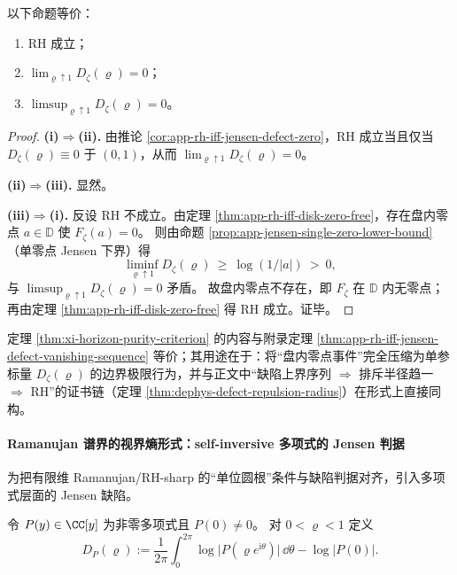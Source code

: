 \begin{theorem}\label{thm:xi-horizon-purity-criterion}
以下命题等价：
\begin{enumerate}
  \item[(i)] RH 成立；
  \item[(ii)] \(\displaystyle \lim_{\varrho\uparrow 1}D_{\zeta}(\varrho)=0\)；
  \item[(iii)] \(\displaystyle \limsup_{\varrho\uparrow 1}D_{\zeta}(\varrho)=0\)。
\end{enumerate}
\end{theorem}

\begin{proof}
\textbf{(i)\(\Rightarrow\)(ii).}
由推论 \ref{cor:app-rh-iff-jensen-defect-zero}，RH 成立当且仅当 \(D_{\zeta}(\varrho)\equiv 0\) 于 \((0,1)\)，从而 \(\lim_{\varrho\uparrow 1}D_{\zeta}(\varrho)=0\)。
\par
\textbf{(ii)\(\Rightarrow\)(iii).}
显然。
\par
\textbf{(iii)\(\Rightarrow\)(i).}
反设 RH 不成立。由定理 \ref{thm:app-rh-iff-disk-zero-free}，存在盘内零点 \(a\in\mathbb{D}\) 使 \(F_{\zeta}(a)=0\)。
则由命题 \ref{prop:app-jensen-single-zero-lower-bound}（单零点 Jensen 下界）得
\[
\liminf_{\varrho\uparrow 1}D_{\zeta}(\varrho)\ \ge\ \log(1/|a|)\ >\ 0,
\]
与 \(\limsup_{\varrho\uparrow 1}D_{\zeta}(\varrho)=0\) 矛盾。
故盘内零点不存在，即 \(F_{\zeta}\) 在 \(\mathbb{D}\) 内无零点；再由定理 \ref{thm:app-rh-iff-disk-zero-free} 得 RH 成立。证毕。
\end{proof}

\begin{remark}[与可审计证书链的对齐]\label{rem:xi-horizon-purity-audit-alignment}
定理 \ref{thm:xi-horizon-purity-criterion} 的内容与附录定理 \ref{thm:app-rh-iff-jensen-defect-vanishing-sequence} 等价；其用途在于：将“盘内零点事件”完全压缩为单参标量 \(D_{\zeta}(\varrho)\) 的边界极限行为，并与正文中“缺陷上界序列 \(\Rightarrow\) 排斥半径趋一 \(\Rightarrow\) RH”的证书链（定理 \ref{thm:dephys-defect-repulsion-radius}）在形式上直接同构。
\end{remark}

\paragraph{Ramanujan 谱界的视界熵形式：self-inversive 多项式的 Jensen 判据}
为把有限维 Ramanujan/RH-sharp 的“单位圆根”条件与缺陷判据对齐，引入多项式层面的 Jensen 缺陷。

\begin{definition}\label{def:xi-poly-jensen-defect}
令 \(P(y)\in\CC[y]\) 为非零多项式且 \(P(0)\neq 0\)。
对 \(0<\varrho<1\) 定义
\[
D_{P}(\varrho)
:=\frac{1}{2\pi}\int_{0}^{2\pi}\log\bigl|P(\varrho e^{\mathrm{i}\theta})\bigr|\,\dd\theta-\log|P(0)|.
\]
\end{definition}

